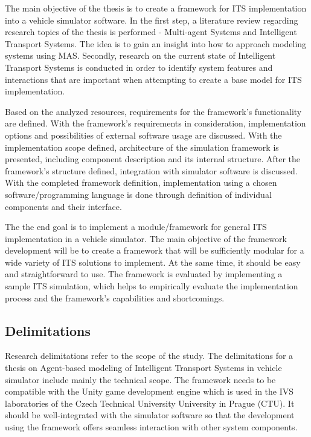 \documentclass[titlepage, 12pt]{article}
\begin{document}
The main objective of the thesis is to create a framework for ITS implementation into a vehicle simulator software. 
In the first step, a literature review regarding research topics of the thesis is performed - Multi-agent Systems and 
Intelligent Transport Systems. The idea is to gain an insight into how to approach modeling systems using 
MAS. Secondly, research on the current state of Intelligent Transport Systems is conducted in 
order to identify system features and interactions that are important when attempting to create a 
base model for ITS implementation. 

Based on the analyzed resources, requirements for the framework's functionality are defined.
With the framework's requirements in consideration, implementation options and possibilities of
external software usage are discussed.  With the implementation scope defined, architecture of
the simulation framework is presented, including component description and its internal structure.
After the framework's structure defined, integration with simulator software is discussed. 
With the completed framework definition, implementation using a chosen software/programming language
is done through definition of individual components and their interface. 

The the end goal is to implement a module/framework for general ITS implementation in a vehicle simulator. 
The main objective of the framework development will be to create a framework that will be sufficiently modular for 
a wide variety of ITS solutions to implement. At the same time, it should be easy and
straightforward to use. The framework is evaluated by implementing a sample ITS simulation,
which helps to empirically evaluate the implementation process and the framework's capabilities
and shortcomings.

\subsection{Delimitations}

Research delimitations refer to the scope of the study. The delimitations for a thesis on
Agent-based modeling of Intelligent Transport Systems in vehicle simulator include mainly the
technical scope. The framework needs to be compatible with the Unity game development
engine which is used in the IVS laboratories of the Czech Technical University University in
Prague (CTU). It should be well-integrated with the simulator software so that the development
using the framework offers seamless interaction with other system components. 
\end{document}
